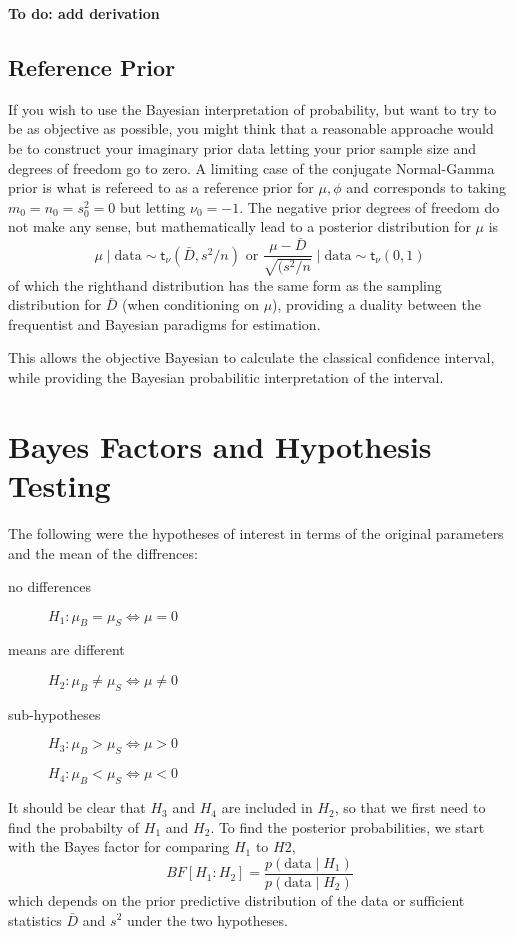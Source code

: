\documentclass[11pt]{article}
\def\BF{\textit{BF}}
\newcommand{\St}{\textsf{t}}
\def\data{\text{data}}
\begin{document}
{\bf To do: add derivation}

\subsection{Reference Prior}

If you wish to use the Bayesian interpretation of probability, but want to try to be as objective as possible, you might think that a reasonable approache would be to construct your imaginary prior data letting your prior sample size and degrees of freedom go to zero.  A limiting case of the conjugate Normal-Gamma prior is what is refereed to as a reference prior for $\mu, \phi$ and corresponds to taking $m_0 = n_0 = s^2_0 = 0$ but letting $\nu_0 = -1$.  The negative prior degrees of freedom do not make any sense, but mathematically lead to 
a posterior distribution for $\mu$ is 
$$
\mu \mid \data  \sim \St_{\nu}(\bar{D}, s^2/n)  \text{ or }  \frac{\mu - \bar{D}}{\sqrt{(s^2/n}}  \mid \data \sim \St_{\nu}(0,1)
$$
of which the righthand distribution has the same form as the sampling distribution  for $\bar{D}$ (when conditioning on $\mu$), providing a duality between the frequentist and Bayesian paradigms for estimation.

This allows the objective Bayesian to calculate the classical confidence interval, while providing the Bayesian probabilitic interpretation of the interval.

\section*{Bayes Factors and Hypothesis Testing}

The following were the hypotheses of interest in terms of the original parameters and the mean of the diffrences:
\begin{description}%
\item [no differences] $H_1:  \mu_B = \mu_S  \Leftrightarrow \mu = 0 $   
\item [means are different] $H_2:  \mu_B \neq \mu_S \Leftrightarrow \mu  \neq 0 $ 
\item [sub-hypotheses]  $H_{3}:  \mu_B > \mu_S \Leftrightarrow \mu  > 0 $ 
\item [ ] $H_{4}:  \mu_B < \mu_S \Leftrightarrow \mu  < 0 $
\end{description}

It should be clear that $H_3$ and $H_4$ are included in $H_2$, so that we first need to find the probabilty of $H_1$ and $H_2$.    To find the posterior probabilities, we start with the Bayes factor for comparing $H_1$  to $H2$,
$$
\BF[H_1: H_2] = \frac{p(\data \mid H_1)} {p(\data \mid H_2)}
$$
which depends on the prior predictive distribution of the data or sufficient statistics $\bar{D}$ and $s^2$ under the two hypotheses. 
\end{document}
